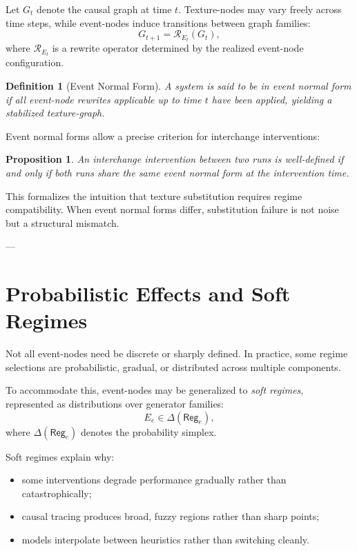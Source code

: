 \documentclass[11pt]{article}
\newtheorem{definition}{Definition}
\newtheorem{proposition}{Proposition}
\theoremstyle{remark}
\newcommand{\Reg}{\mathsf{Reg}}
\begin{document}
Let \(G_t\) denote the causal graph at time \(t\). Texture-nodes may vary freely across time steps, while event-nodes induce transitions between graph families:
\[
G_{t+1} = \mathcal{R}_{E_t}(G_t),
\]
where \(\mathcal{R}_{E_t}\) is a rewrite operator determined by the realized event-node configuration.

\begin{definition}[Event Normal Form]
A system is said to be in \emph{event normal form} if all event-node rewrites applicable up to time \(t\) have been applied, yielding a stabilized texture-graph.
\end{definition}

Event normal forms allow a precise criterion for interchange interventions:
\begin{proposition}
An interchange intervention between two runs is well-defined if and only if both runs share the same event normal form at the intervention time.
\end{proposition}

This formalizes the intuition that texture substitution requires regime compatibility. When event normal forms differ, substitution failure is not noise but a structural mismatch.

---

\section{Probabilistic Effects and Soft Regimes}

Not all event-nodes need be discrete or sharply defined. In practice, some regime selections are probabilistic, gradual, or distributed across multiple components.

To accommodate this, event-nodes may be generalized to \emph{soft regimes}, represented as distributions over generator families:
\[
E_e \in \Delta(\Reg_e),
\]
where \(\Delta(\Reg_e)\) denotes the probability simplex.

Soft regimes explain why:
\begin{itemize}
\item some interventions degrade performance gradually rather than catastrophically;
\item causal tracing produces broad, fuzzy regions rather than sharp points;
\item models interpolate between heuristics rather than switching cleanly.
\end{itemize}
\end{document}
